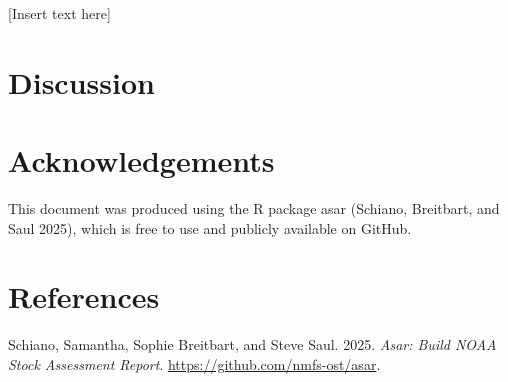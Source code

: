 \documentclass[
]{scrartcl}
\newlength{\cslhangindent}
\newenvironment{CSLReferences}[2] %
 {\begin{list}{}{%
  \setlength{\itemindent}{0pt}
  \setlength{\leftmargin}{0pt}
  \setlength{\parsep}{0pt}
  \ifodd #1
   \setlength{\leftmargin}{\cslhangindent}
   \setlength{\itemindent}{-1\cslhangindent}
  \fi
  \setlength{\itemsep}{#2\baselineskip}}}
 {\end{list}}
\begin{document}
{[}Insert text here{]}

\newpage{}

\section{Discussion}\label{sec-discussion}

\newpage{}

\section{Acknowledgements}\label{sec-acknowledgements}

This document was produced using the R package asar (Schiano, Breitbart,
and Saul 2025), which is free to use and publicly available on GitHub.

\newpage{}

\section{References}\label{sec-refs}

\label{refs}
\begin{CSLReferences}{1}{0}
Schiano, Samantha, Sophie Breitbart, and Steve Saul. 2025. \emph{Asar:
Build NOAA Stock Assessment Report}.
\url{https://github.com/nmfs-ost/asar}.

\end{CSLReferences}
\end{document}
